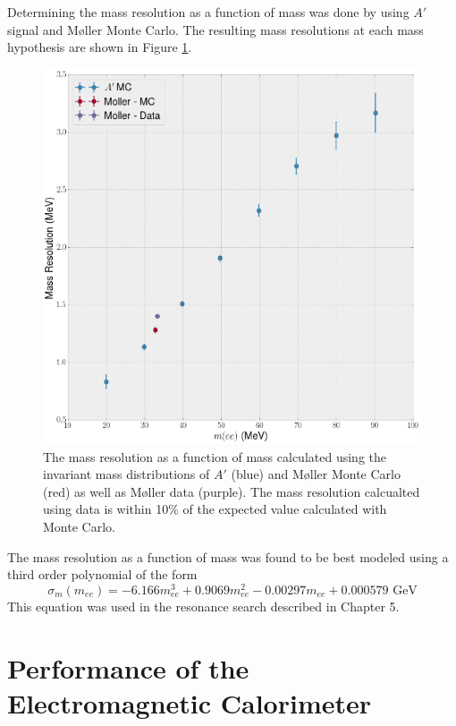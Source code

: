 Determining the mass resolution as a function of mass was done by using $A'$ 
signal and M\o ller Monte Carlo. The resulting mass resolutions at each mass 
hypothesis are shown in Figure \ref{fig:mass_resolution}. 
\begin{figure}[h!t]
    \centering
    \includegraphics[width=.8\textwidth]{images/invariant_mass_curve.png}
    \caption{The mass resolution as a function of mass calculated using 
              the invariant mass distributions of
              $A'$ (blue) and M\o ller Monte Carlo (red) as well as M\o ller 
         data (purple).  The mass resolution calcualted using data is within
            10\% of the expected value calculated with Monte Carlo.}
    \label{fig:mass_resolution}
\end{figure}
The mass resolution as a function of mass was found to be best modeled using
a third order polynomial of the form
\begin{equation}
    \sigma_{m}(m_{ee}) = -6.166 m_{ee}^3 + 0.9069 m_{ee}^2 - 0.00297 m_{ee} + 0.000579 \text{ GeV}
\end{equation}
This equation was used in the resonance search described in Chapter 5. 

\section{Performance of the Electromagnetic Calorimeter}

